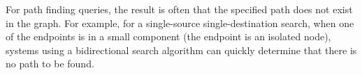 
For path finding queries, the result is often that the specified path does not
exist in the graph. For example, for a single-source single-destination search,
when one of the endpoints is in a small component (\eg the endpoint is an
isolated node), systems using a bidirectional search algorithm can quickly
determine that there is no path to be found.



